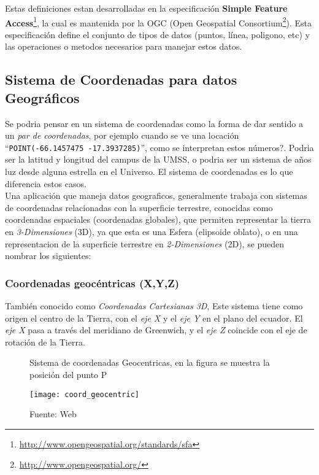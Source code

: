     Estas definiciones estan desarrolladas en la especificaci\'on \textbf{Simple Feature Access}\footnote{\url{http://www.opengeospatial.org/standards/sfa}}, la cual es mantenida por la OGC (Open Geospatial Consortium\footnote{\url{http://www.opengeospatial.org/}}). Esta especificaci\'on define el conjunto de tipos de datos (puntos, l\'inea, poligono, etc) y las operaciones o metodos necesarios para manejar estos datos.

  \subsection{Sistema de Coordenadas para datos Geográficos} %
  \label{sub:sistema_de_coordenadas_para_datos_geograficos}
    Se podria pensar en un sistema de coordenadas como la forma de dar sentido a un \emph{par de coordenadas}, por ejemplo cuando se ve una locaci\'on ``\verb|POINT(-66.1457475 -17.3937285)|'', como se interpretan estos n\'umeros?.
    Podria ser la latitud y longitud del campus de la UMSS, o podria ser un sistema de a\~nos luz desde alguna estrella en el Universo.
    El sistema de coordenadas es lo que diferencia estos casos.\\


    Una aplicaci\'on que maneja datos geograficos, generalmente trabaja con sistemas de coordenadas relacionadas con la superficie terrestre, conocidas como coordenadas espaciales (coordenadas globales), que permiten representar la tierra en \emph{3-Dimensiones} (3D), ya que esta es una Esfera (elipsoide oblato), o en una representacion de la superficie terrestre en \emph{2-Dimensiones} (2D), se pueden nombrar los siguientes:

    \subsubsection{Coordenadas geocéntricas (X,Y,Z)} %
      \label{subs:coordenadas_geocentricas}
        También conocido como \emph{Coordenadas Cartesianas 3D}, Este sistema tiene como origen el centro de la Tierra, con el \emph{eje X} y el \emph{eje Y} en el plano del ecuador. El \emph{eje X} pasa a través del meridiano de Greenwich, y el \emph{eje Z}  coincide con el eje de rotación de la Tierra.

        \begin{figure}[H]
          \begin{center}
            \caption[Sistema de coordenadas Geocentricas ]{Sistema de coordenadas Geocentricas, en la figura se muestra la posici\'on del punto P}
            \label{fig:coord_geocentric}
            \texttt{[image: coord\_geocentric]}
            \caption*{Fuente: Web}
          \end{center}
        \end{figure}

